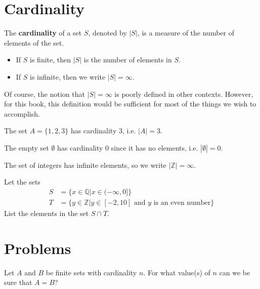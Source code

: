\section{Cardinality}
\begin{definition}
    The \textbf{cardinality} of a set $S$, denoted by $|S|$, is a measure of the number of elements of the set.
    \begin{itemize}
        \item If $S$ is finite, then $|S|$ is the number of elements in $S$.
        \item If $S$ is infinite, then we write $|S| = \infty$.
    \end{itemize}
\end{definition}
\begin{remark}
    Of course, the notion that $|S| = \infty$ is poorly defined in other contexts. However, for this book, this definition would be sufficient for most of the things we wish to accomplish.
\end{remark}
\begin{example}
    The set $A = \{1, 2, 3\}$ has cardinality 3, i.e. $|A| = 3$.
\end{example}
\begin{example}
    The empty set $\emptyset$ has cardinality 0 since it has no elements, i.e. $|\emptyset| = 0$.
\end{example}
\begin{example}
    The set of integers has infinite elements, so we write $|\mathbb{Z}| = \infty$.
\end{example}

\begin{exercise}
    Let the sets
    \begin{align*}
        S &= \{x \in \mathbb{Q} \vert x \in (-\infty, 0]\}\\
        T &= \{y \in \mathbb{Z} \vert y \in [-2, 10] \text{ and } y \text{ is an even number} \}
    \end{align*}
    List the elements in the set $S \cap T$.
\end{exercise}

\newpage

\section{Problems}
\begin{problem}
    Let $A$ and $B$ be finite sets with cardinality $n$. For what value(s) of $n$ can we be sure that $A = B$?
\end{problem}

